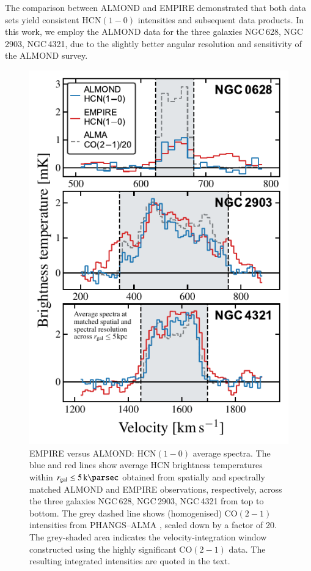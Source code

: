 \documentclass[letter, longauth]{aa} %
\newcommand*{\hcnone}{\ensuremath{\mathrm{HCN(1-0)}}\xspace} %
\newcommand*{\cotwo}{\ensuremath{\mathrm{CO(2-1)}}\xspace} %
\newcommand*{\rgal}{\ensuremath{r_{\rm gal}}\xspace} %
\begin{document}
\begin{appendix}
The comparison between ALMOND and EMPIRE demonstrated that both data sets yield consistent \hcnone intensities and subsequent data products.
In this work, we employ the ALMOND data for the three galaxies NGC\,628, NGC\,2903, NGC\,4321, due to the slightly better angular resolution and sensitivity of the ALMOND survey.

\begin{figure}
\centering
\includegraphics[width=\columnwidth]{Figures/ALMOND_vs_EMPIRE_spectra_compressed_v2.pdf}
\caption{EMPIRE versus ALMOND: \hcnone average spectra.
The blue and red lines show average HCN brightness temperatures within $\rgal\leq\SI{5}{\kilo\parsec}$ obtained from spatially and spectrally matched ALMOND and EMPIRE observations, respectively, across the three galaxies NGC\,628, NGC\,2903, NGC\,4321 from top to bottom.
The grey dashed line shows (homogenised) \cotwo intensities from PHANGS--ALMA \citep{Leroy2021b}, scaled down by a factor of 20.
The grey-shaded area indicates the velocity-integration window constructed using the highly significant \cotwo data.
The resulting integrated intensities are quoted in the text.
}
\label{fig:empire_vs_almond_spectra}
\end{figure}


\end{appendix}
\end{document}
